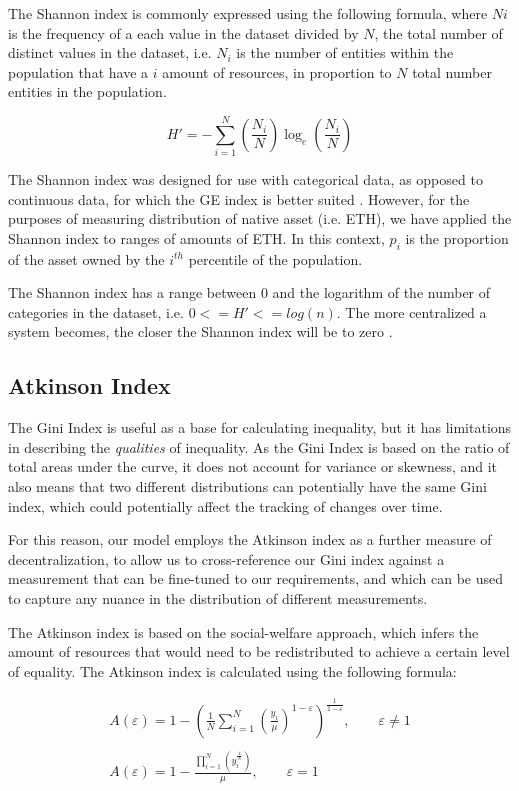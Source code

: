 \documentclass[conference]{IEEEtran}
\begin{document}
The Shannon index is commonly expressed using the following formula, where $Ni$ is the frequency of a each value in the dataset divided by $N$, the total number of distinct values in the dataset, i.e. $N_i$ is the number of entities within the population that have a $i$ amount of resources, in proportion to $N$ total number entities in the population.

\[H' = - \sum_{i=1}^{N} \left(\frac{N_i}{N}\right) \log_{e} \left(\frac{N_i}{N}\right)\]

The Shannon index was designed for use with categorical data, as opposed to continuous data, for which the GE index is better suited \cite{tran2021harnessing}.   However, for the purposes of measuring distribution of native asset (i.e. ETH), we have applied the Shannon index to ranges of amounts of ETH.  In this context, $p_i$ is the proportion of the asset owned by the $i^{th}$ percentile of the population.

The Shannon index has a range between 0 and the logarithm of the number of categories in the dataset, i.e. $0<=H'<=log(n)$.  The more centralized a system becomes, the closer the Shannon index will be to zero \cite{kusmierz2022centralized}.

\subsection{Atkinson Index}

The Gini Index is useful as a base for calculating inequality, but it has limitations in describing the \textit{qualities} of inequality.  As the Gini Index is based on the ratio of total areas under the curve, it does not account for variance or skewness, and it also means that two different distributions can potentially have the same Gini index, which could potentially affect the tracking of changes over time.

For this reason, our model employs the Atkinson index \cite{atkinson1970measurement} as a further measure of decentralization, to allow us to cross-reference our Gini index against a measurement that can be fine-tuned to our requirements, and which can be used to capture any nuance in the distribution of different measurements.

The Atkinson index is based on the social-welfare approach, which infers the amount of resources that would need to be redistributed to achieve a certain level of equality.  The Atkinson index is calculated using the following formula:

\begin{align*}
A(\varepsilon) = 1 - \left(\frac{1}{N} \sum_{i=1}^{N} \left(\frac{y_i}{\mu}\right)^{1 - \varepsilon}\right)^{\frac{1}{1 - \varepsilon}}, \quad \quad \varepsilon \neq 1 \\
\quad \\
A\left( \varepsilon \right)=1-\frac{\prod_{i=1}^{N}\left( y_{i}^{\frac{1}{N}} \right)}{\mu}, \quad \quad \varepsilon=1
\end{align*}
\end{document}
